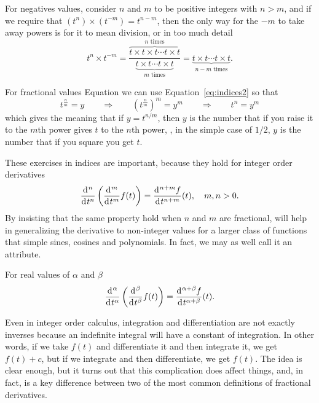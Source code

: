 For negatives values, consider $n$ and $m$ to be positive integers with $n > m$, and if we require that $\left( t^n \right) \times \left( t^{-m} \right) = t^{n-m}$, then the only way for the $-m$ to take away powers is for it to mean division, or in too much detail
\begin{equation}
  t^n \times t^{-m} = \frac{\overbrace{t \times t \times t \cdots t \times t}^{\mbox{$n$ times}}}{\underbrace{t \times t \cdots t \times t}_{\mbox{$m$ times}}} = \underbrace{t \times t  \cdots t \times t}_{\mbox{$n-m$ times}}.
  \label{eq:indices3}
\end{equation}

For fractional values Equation we can use Equation~\ref{eq:indices2} so that
\begin{equation}
  t^\frac{n}{m} = y \qquad \Longrightarrow \qquad \left( t^\frac{n}{m} \right)^m = y^m \qquad \Longrightarrow \qquad t^n = y^m
\end{equation}
which gives the meaning that if $y = t^{n/m}$, then $y$ is the number that if you raise it to the $m$th power gives $t$ to the $n$th power, \eg, in the simple case of $1/2$, $y$ is the number that if you square you get $t$.

These exercises in indices are important, because they hold for integer order derivatives
\begin{equation}
  \label{eq:derivindex}
  \frac{\operatorname{d}\hspace*{-1pt}^n}{\operatorname{d}\hspace*{-1pt} t^n} \left( \frac{\operatorname{d}\hspace*{-1pt}^m}{\operatorname{d}\hspace*{-1pt} t^m} f(t) \right) = \frac{\operatorname{d}\hspace*{-1pt}^{n+m} f}{\operatorname{d}\hspace*{-1pt} t^{n+m}}(t), \quad m,n > 0.
\end{equation}
By insisting that the same property hold when $n$ and $m$ are fractional, will help in generalizing the derivative to non-integer values for a larger class of functions that simple sines, cosines and polynomials. In fact, we may as well call it an attribute. 

\begin{attribute}
  For real values of $\alpha$ and $\beta$
  \begin{equation}
    \frac{\operatorname{d}\hspace*{-1pt}^\alpha}{\operatorname{d}\hspace*{-1pt} t^\alpha} \left( \frac{\operatorname{d}\hspace*{-1pt}^\beta}{\operatorname{d}\hspace*{-1pt} t^\beta} f(t) \right) = \frac{\operatorname{d}\hspace*{-1pt}^{\alpha + \beta} f}{\operatorname{d}\hspace*{-1pt} t^{\alpha + \beta}}(t).
    \label{eq:derivindices}
  \end{equation}
\end{attribute}

Even in integer order calculus, integration and differentiation are not exactly inverses because an indefinite integral will have a constant of integration. In other words, if we take $f(t)$ and differentiate it and then integrate it, we get $f(t) + c$, but if we integrate and then differentiate, we get $f(t)$. The idea is clear enough, but it turns out that this complication does affect things, and, in fact, is a key difference between two of the most common definitions of fractional derivatives. 


